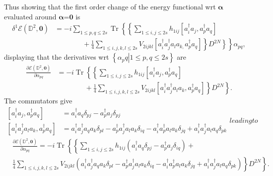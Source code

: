 \documentclass[aps,preprint]{revtex4}%
\begin{document}
Thus showing that the first order change of the energy functional
wrt $\bm{\alpha}$ evaluated around $\bm{\alpha}$=$\bm{0}$ is
\begin{align}
\delta^{1}\mathcal{E}\left(  \mathbb{D}^{2},\bm{0}\right)   &  =-i\sum_{1\leq
p,q\leq2s}\operatorname{Tr}\left\{  \left\{  \sum_{1\leq i,j\leq2s}%
h_{1ij}\left[  a_{i}^{\dagger}a_{j},a_{p}^{\dagger}a_{q}\right]  \right.
\right. \nonumber\\
&  \qquad\qquad+\left.  \left.  \frac{1}{4}\sum_{1\leq i,j,k,l\leq2s}%
V_{2ijkl}\left[  a_{i}^{\dagger}a_{j}^{\dagger}a_{l}a_{k,}a_{p}^{\dagger}%
a_{q}\right]  \right\}  \left.  D^{2N}\right\}  \right\}  \alpha_{pq},
\end{align}
displaying that the derivatives wrt $\left\{  \left.  \alpha_pq\right\vert
1\leq p,q\leq2s\right\}  $ are
\begin{align}
\frac{\partial\mathcal{E}\left(  \mathbb{D}^{2},\bm{0}\right)  }%
{\partial\alpha_{pq}}  &  =-i\operatorname{Tr}\left\{  \left\{  \sum_{1\leq
i,j\leq2s}h_{1ij}\left[  a_{i}^{\dagger}a_{j},a_{p}^{\dagger}a_{q}\right]
\right.  \right. \nonumber\\
&  \qquad\qquad+\left.  \left.  \frac{1}{4}\sum_{1\leq i,j,k,l\leq2s}%
V_{2ijkl}\left[  a_{i}^{\dagger}a_{j}^{\dagger}a_{l}a_{k},a_{p}^{\dagger}%
a_{q}\right]  \right\}  D^{2N}\right\}  .
\end{align}
The commutators give
\begin{subequations}
\begin{align}
\left[  a_{i}^{\dagger}a_{j},a_{p}^{\dagger}a_{q}\right]   &  =a_{i}^{\dagger
}a_{q}\delta_{pj}-a_{p}^{\dagger}a_{j}\delta_{pj}\\
\left[  a_{i}^{\dagger}a_{j}^{\dagger}a_{l}a_{k},a_{p}^{\dagger}a_{q}\right]
&  =a_{i}^{\dagger}a_{j}^{\dagger}a_{q}a_{k}\delta_{pl}-a_{p}^{\dagger}%
a_{j}^{\dagger}a_{l}a_{k}\delta_{iq}-a_{i}^{\dagger}a_{p}^{\dagger}a_{l}%
a_{k}\delta_{jq}+a_{i}^{\dagger}a_{j}^{\dagger}a_{l}a_{q}\delta_{pk}%
\end{align}
leading to
\end{subequations}
\begin{align}
&  \frac{\partial\mathcal{E}\left(  \mathbb{D}^{2},\bm{0}\right)  }%
{\partial\alpha_{pq}}=-i\operatorname{Tr}\left\{  \left\{  \sum_{1\leq
i,j\leq2s}h_{1ij}\left(  a_{i}^{\dagger}a_{q}\delta_{pj}-a_{p}^{\dagger}%
a_{j}\delta_{iq}\right)  \right.  \right.  +\nonumber\\
&  \left.  \left.  \frac{1}{4}\sum_{1\leq i,j,k,l\leq2s}V_{2ijkl}\left(
a_{i}^{\dagger}a_{j}^{\dagger}a_{q}a_{k}\delta_{pl}-a_{p}^{\dagger}%
a_{j}^{\dagger}a_{l}a_{k}\delta_{iq}-a_{i}^{\dagger}a_{p}^{\dagger}a_{l}%
a_{k}\delta_{jq}+a_{i}^{\dagger}a_{j}^{\dagger}a_{l}a_{q}\delta_{pk}\right)
\right\}  D^{2N}\right\}  .
\end{align}
\end{document}
